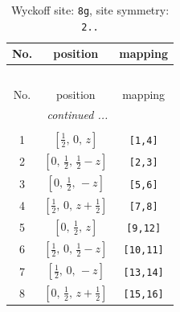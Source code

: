 \documentclass[fleqn,8pt]{jsarticle}
\begin{document}
\begin{longtable}{ccc}
\caption{Wyckoff site: {\tt 8g}, site symmetry: {\tt 2..}}
 \\
 \hline \hline
No. & position & mapping \\ \hline \endfirsthead

\multicolumn{2}{l}{\tablename\ \thetable{}} \\
 \hline \hline
No. & position & mapping \\ \hline \endhead

 \hline \hline
\multicolumn{2}{r}{\footnotesize\it continued ...} \\ \endfoot

 \hline \hline
\multicolumn{2}{r}{} \\ \endlastfoot

1 & $\left[ \frac{1}{2},\, 0,\, z \right]$ & {\tt [1,4]} \\ \hline
2 & $\left[ 0,\, \frac{1}{2},\, \frac{1}{2} - z \right]$ & {\tt [2,3]} \\ \hline
3 & $\left[ 0,\, \frac{1}{2},\, - z \right]$ & {\tt [5,6]} \\ \hline
4 & $\left[ \frac{1}{2},\, 0,\, z + \frac{1}{2} \right]$ & {\tt [7,8]} \\ \hline
5 & $\left[ 0,\, \frac{1}{2},\, z \right]$ & {\tt [9,12]} \\ \hline
6 & $\left[ \frac{1}{2},\, 0,\, \frac{1}{2} - z \right]$ & {\tt [10,11]} \\ \hline
7 & $\left[ \frac{1}{2},\, 0,\, - z \right]$ & {\tt [13,14]} \\ \hline
8 & $\left[ 0,\, \frac{1}{2},\, z + \frac{1}{2} \right]$ & {\tt [15,16]} \\
\end{longtable}
\renewcommand{\arraystretch}{1.2}
\end{document}
